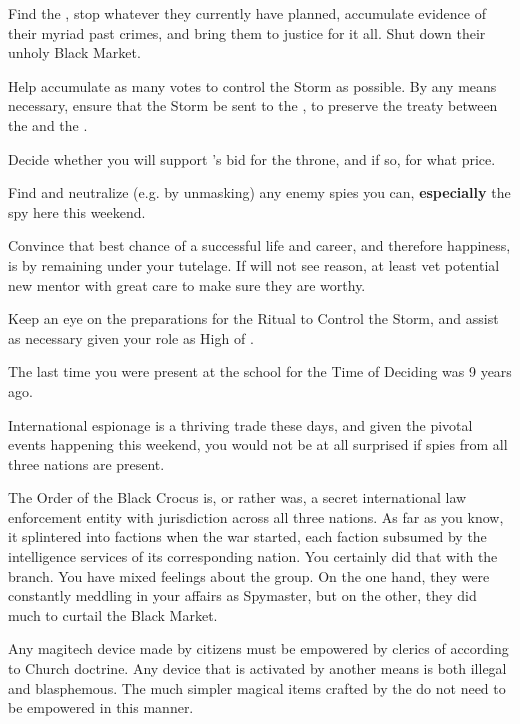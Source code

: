 \documentclass[char]{GL2020}
\begin{document}
\begin{itemz}
    \item Find the \pGoaties{}, stop whatever they currently have planned, accumulate evidence of their myriad past crimes, and bring them to justice for it all. Shut down their unholy Black Market.
    \item Help \cScholarship{} accumulate as many votes to control the Storm as possible. By any means necessary, ensure that the Storm be sent to the \pShip{}, to preserve the treaty between the \pFarm{} and the \pTech{}.
    \item Decide whether you will support \cPrince{}’s bid for the throne, and if so, for what price. 
     \item Find and neutralize (e.g. by unmasking) any enemy spies you can, \textbf{especially} the \pShip{} spy here this weekend.
    \item Convince \cScholarship{} that \cScholarship{\their} best chance of a successful life and career, and therefore happiness, is by remaining under your tutelage. If \cScholarship{\they} will not see reason, at least vet \cScholarship{\their} potential new mentor with great care to make sure they are worthy.
    \item Keep an eye on the preparations for the Ritual to Control the Storm, and assist as necessary given your role as High \cAntiChup{\Cleric} of \cTechGod{}. 
\end{itemz}

\begin{itemz}[Notes]
    \item The last time you were present at the school for the Time of Deciding was 9 years ago.
    \item International espionage is a thriving trade these days, and given the pivotal events happening this weekend, you would not be at all surprised if spies from all three nations are present.
    \item The Order of the Black Crocus is, or rather was, a secret international law enforcement entity with jurisdiction across all three nations. As far as you know, it splintered into factions when the war started, each faction subsumed by the intelligence services of its corresponding nation. You certainly did that with the \pTech{} branch. You have mixed feelings about the group. On the one hand, they were constantly meddling in your affairs as Spymaster, but on the other, they did much to curtail the Black Market.
    \item Any magitech device made by \pTech{} citizens must be empowered by clerics of \cTechGod{} according to Church doctrine. Any device that is activated by another means is both illegal and blasphemous. The much simpler magical items crafted by the \pShippies{} do not need to be empowered in this manner.
\end{itemz}
\end{document}

